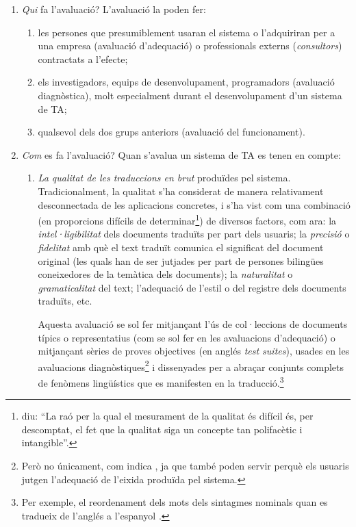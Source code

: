 \begin{enumerate}
\item \emph{Qui} fa l'avaluació? L'avaluació la poden fer:
  \begin{enumerate}
  \item les persones que presumiblement usaran el sistema o
    l'adquiriran per a una empresa (avaluació d'adequació) o
    professionals externs (\emph{consultors}) contractats a l'efecte;
  \item els investigadors, equips de desenvolupament, programadors
    (avaluació diagnòstica), molt especialment durant el
    desenvolupament d'un sistema de TA;
  \item qualsevol dels dos grups anteriors (avaluació del
    funcionament).
  \end{enumerate}
\item \emph{Com} es fa l'avaluació? Quan s'avalua un sistema de TA es
  tenen en compte:
  \begin{enumerate}
  \item \emph{La qualitat de les traduccions en brut} produïdes pel
    sistema. Tradicionalment, la qualitat s'ha considerat de manera
    relativament desconnectada de les aplicacions concretes, i s'ha
    vist com una combinació (en proporcions difícils de
    determinar\footnote{\citet{minnis94j} diu: ``La raó per la qual el
      mesurament de la qualitat és difícil és, per descomptat, el fet
      que la qualitat siga un concepte tan polifacètic i
      intangible''.})  de diversos factors, com ara:
    la \emph{intel·ligibilitat} dels documents traduïts per part dels
    usuaris; la \emph{precisió} o \emph{fidelitat} amb què el text
    traduït comunica el significat del document original (les quals
    han de ser jutjades per part de persones bilingües coneixedores de
    la temàtica dels documents); la \emph{naturalitat} o
    \emph{gramaticalitat} del text; l'adequació de l'estil o del
    registre dels documents traduïts, etc.

    Aquesta avaluació se sol fer mitjançant l'ús de col·leccions de
    documents típics o representatius (com se sol fer en les
    avaluacions d'adequació) o mitjançant sèries de proves objectives
    (en anglés \emph{test suites}), usades en les avaluacions
    diagnòstiques\footnote{Però no únicament, com indica
      \citet{lewis97j}, ja que també poden servir perquè els usuaris
      jutgen l'adequació de l'eixida produïda pel sistema.} i
    dissenyades per a abraçar conjunts complets de fenòmens
    lingüístics que es manifesten en la traducció.\footnote{Per
      exemple, el reordenament dels mots dels sintagmes nominals quan
      es tradueix de l'anglés a l'espanyol
      \citep{mira98j,forcada00p}.}


\end{enumerate}
\end{enumerate}
